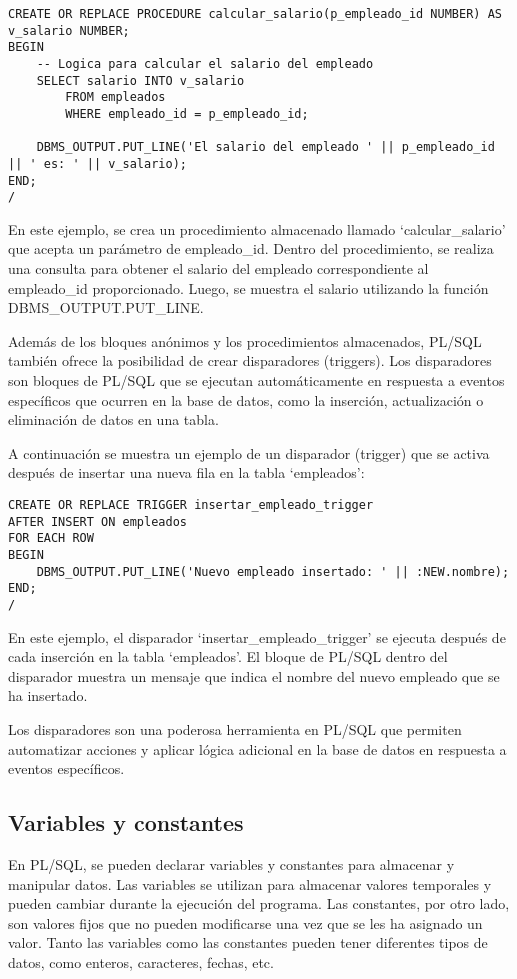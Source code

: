 \documentclass[executivepaper]{article}
\begin{document}
\begin{lstlisting}
CREATE OR REPLACE PROCEDURE calcular_salario(p_empleado_id NUMBER) AS
v_salario NUMBER;
BEGIN
    -- Logica para calcular el salario del empleado
    SELECT salario INTO v_salario
        FROM empleados
        WHERE empleado_id = p_empleado_id;

    DBMS_OUTPUT.PUT_LINE('El salario del empleado ' || p_empleado_id || ' es: ' || v_salario);
END;
/
\end{lstlisting}

En este ejemplo, se crea un procedimiento almacenado llamado \enquote*{calcular\_salario} que acepta un parámetro de empleado\_id. Dentro del procedimiento, se realiza una consulta para obtener el salario del empleado correspondiente al empleado\_id proporcionado. Luego, se muestra el salario utilizando la función DBMS\_OUTPUT.PUT\_LINE.

Además de los bloques anónimos y los procedimientos almacenados, PL/SQL también ofrece la posibilidad de crear disparadores (triggers). Los disparadores son bloques de PL/SQL que se ejecutan automáticamente en respuesta a eventos específicos que ocurren en la base de datos, como la inserción, actualización o eliminación de datos en una tabla.

A continuación se muestra un ejemplo de un disparador (trigger) que se activa después de insertar una nueva fila en la tabla \enquote*{empleados}:

\begin{lstlisting}
CREATE OR REPLACE TRIGGER insertar_empleado_trigger
AFTER INSERT ON empleados
FOR EACH ROW
BEGIN
    DBMS_OUTPUT.PUT_LINE('Nuevo empleado insertado: ' || :NEW.nombre);
END;
/
\end{lstlisting}

En este ejemplo, el disparador \enquote*{insertar\_empleado\_trigger} se ejecuta después de cada inserción en la tabla \enquote*{empleados}. El bloque de PL/SQL dentro del disparador muestra un mensaje que indica el nombre del nuevo empleado que se ha insertado.

Los disparadores son una poderosa herramienta en PL/SQL que permiten automatizar acciones y aplicar lógica adicional en la base de datos en respuesta a eventos específicos.

\subsection{Variables y constantes}
En PL/SQL, se pueden declarar variables y constantes para almacenar y manipular datos. Las variables se utilizan para almacenar valores temporales y pueden cambiar durante la ejecución del programa. Las constantes, por otro lado, son valores fijos que no pueden modificarse una vez que se les ha asignado un valor. Tanto las variables como las constantes pueden tener diferentes tipos de datos, como enteros, caracteres, fechas, etc.
\end{document}
